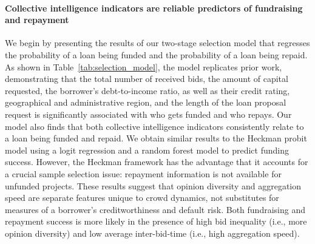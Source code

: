 \documentclass[sigconf]{acmart}
\begin{document}
\paragraph{Collective intelligence indicators are reliable predictors of fundraising and repayment} We begin by presenting the results of our two-stage selection model that regresses the probability of a loan being funded and the probability of a loan being repaid. As shown in Table~\ref{tab:selection_model}, the model replicates prior work, demonstrating that the total number of received bids, the amount of capital requested, the borrower’s debt-to-income ratio, as well as their credit rating, geographical and administrative region, and the length of the loan proposal request is significantly associated with who gets funded and who repays. Our model also finds that both collective intelligence indicators consistently relate to a loan being funded and repaid. We obtain similar results to the Heckman probit model using a logit regression and a random forest model to predict funding success. However, the Heckman framework has the advantage that it accounts for a crucial sample selection issue: repayment information is not available for unfunded projects. These results suggest that opinion diversity and aggregation speed are separate features unique to crowd dynamics, not substitutes for measures of a borrower’s creditworthiness and default risk. Both fundraising and repayment success is more likely in the presence of high bid inequality (i.e., more opinion diversity) and low average inter-bid-time (i.e., high aggregation speed).
\end{document}
